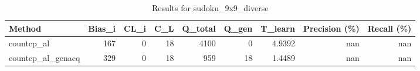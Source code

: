 \begin{table}[ht]
\caption{Results for sudoku_9x9_diverse}
\begin{tabular}{lrrrrrrrr}
\hline
 Method            &   Bias\_i &   CL\_i &   C\_L &   Q\_total &   Q\_gen &   T\_learn &   Precision (\%) &   Recall (\%) \\
\hline
 countcp\_al        &      167 &      0 &    18 &      4100 &       0 &    4.9392 &             nan &          nan \\
 countcp\_al\_genacq &      329 &      0 &    18 &       959 &      18 &    1.4489 &             nan &          nan \\
\hline
\end{tabular}
\end{table}